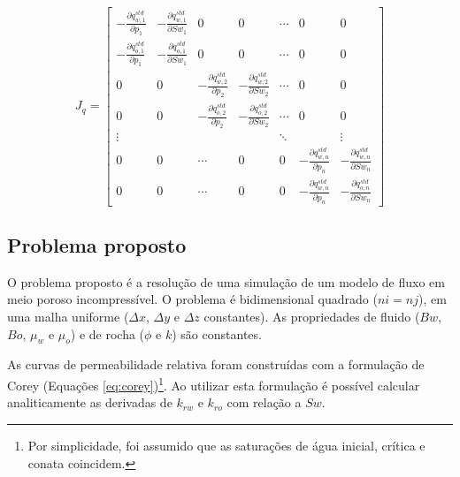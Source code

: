 \documentclass[final,5p]{elsarticle}
\numberwithin{equation}{section}
\begin{document}
            \begin{figure*}
                \begin{equation}
                J_{q} =
                \begin{bmatrix}
                        -\frac{\partial q^{std}_{w,1}}{\partial p_1} & - \frac{\partial q^{std}_{w,1}}{\partial Sw_1} & 0 & 0 & \cdots & 0 & 0 \\
                        -\frac{\partial q^{std}_{o,1}}{\partial p_1} & - \frac{\partial q^{std}_{o,1}}{\partial Sw_1} & 0 & 0 & \cdots & 0 & 0 \\

                        0 & 0 & -\frac{\partial q^{std}_{w,2}}{\partial p_2} & -\frac{\partial q^{std}_{w,2}}{\partial Sw_2} & \cdots & 0 & 0 \\
                        0 & 0 & -\frac{\partial q^{std}_{o,2}}{\partial p_2} & -\frac{\partial q^{std}_{o,2}}{\partial Sw_2} & \cdots & 0 & 0 \\

                        \vdots     &     &      &  & \ddots &  & \vdots \\
                        0 & 0 & \cdots & 0 &  0 & -\frac{\partial q^{std}_{w,n}}{\partial p_n} &  -\frac{\partial q^{std}_{w,n}}{\partial Sw_n} \\
                        0 & 0 & \cdots & 0 &  0 & -\frac{\partial q^{std}_{w,n}}{\partial p_n} &  -\frac{\partial q^{std}_{o,n}}{\partial Sw_n}
                \end{bmatrix}
                \label{eq:sistemajacq}
            \end{equation}
            \end{figure*}

    \subsection{Problema proposto}

        O problema proposto é a resolução de uma simulação de um modelo de fluxo em meio poroso incompressível. O problema é bidimensional quadrado ($ni=nj$), em uma malha uniforme ($\Delta x$, $\Delta y$ e $\Delta z$ constantes). As propriedades de fluido ($Bw$, $Bo$, $\mu_w$ e $\mu_o$) e de rocha ($\phi$ e $k$) são constantes.

        As curvas de permeabilidade relativa foram construídas com a formulação de Corey (Equações \ref{eq:corey})\footnote{Por simplicidade, foi assumido que as saturações de água inicial, crítica e conata coincidem.}. Ao utilizar esta formulação é possível calcular analiticamente as derivadas de $k_{rw}$ e $k_{ro}$ com relação a $Sw$.
\end{document}
